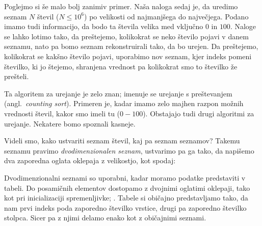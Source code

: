 
Poglejmo si še malo bolj zanimiv primer.
Naša naloga sedaj je, da uredimo seznam $N$ števil ($N \le 10^6$) po velikosti
od najmanjšega do največjega.
Podano imamo tudi informacijo, da bodo ta števila velika med vključno $0$ in
$100$.
Naloge se lahko lotimo tako, da preštejemo, kolikokrat se neko število pojavi v
danem seznamu, nato pa bomo seznam rekonstruirali tako, da bo urejen.
Da preštejemo, kolikokrat se kakšno število pojavi, uporabimo nov seznam, kjer
indeks pomeni številko, ki jo štejemo, shranjena vrednost pa kolikokrat smo to
številko že prešteli.


Ta algoritem za urejanje je zelo znan; imenuje se urejanje s preštevanjem
(angl.~\emph{counting sort}).
Primeren je, kadar imamo zelo majhen razpon možnih vrednosti števil, kakor smo
imeli tu ($0 - 100$).
Obstajajo tudi drugi algoritmi za urejanje.
Nekatere bomo spoznali kasneje.


Videli smo, kako ustvariti seznam števil, kaj pa seznam seznamov?
Takemu seznamu pravimo \emph{dvodimenzionalen seznam}, ustvarimo pa ga tako,
da napišemo dva zaporedna oglata oklepaja z velikostjo, kot spodaj:


Dvodimenzionalni seznami so uporabni, kadar moramo podatke predstaviti v tabeli.
Do posamičnih elementov dostopamo z dvojnimi oglatimi oklepaji, tako kot pri
inicializaciji spremenljivke; .
Tabele si običajno predstavljamo tako, da nam prvi indeks poda zaporedno
številko vrstice, drugi pa zaporedno številko stolpca.
Sicer pa z njimi delamo enako kot z običajnimi seznami.